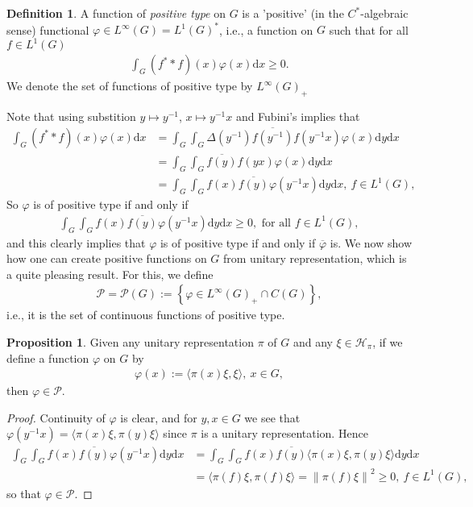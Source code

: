 \documentclass[10pt,twoside,openany,final]{memoir}
\theoremstyle{definition}
\newtheorem{proposition}[theorem]{Proposition}
\newtheorem{definition}[theorem]{Definition}
\theoremstyle{Break}
\newcommand{\lv}{\left\lVert}
\newcommand{\rv}{\right\rVert}
\renewcommand{\H}{\mathcal{H}}
\renewcommand{\d}{\mathrm{d}}
\begin{document}
\begin{definition}
	A function of \emph{positive type} on $G$ is a 'positive' (in the $C^*$-algebraic sense) functional $\varphi \in L^\infty(G)=L^1(G)^*$, i.e., a function on $G$ such that for all $f \in L^1(G)$ 
	\begin{align*}
	\int_G (f^*\ast f)(x)\varphi(x) \d x \geq 0.
	\end{align*}
	We denote the set of functions of positive type by $L^\infty(G)_+$
\end{definition}
Note that using substition $y \mapsto y^{-1}$, $x \mapsto y^{-1}x$ and Fubini's implies that
\begin{align*}
	\int_G (f^* \ast f)(x) \varphi(x)\d x &= \int_G \int_G \Delta(y^{-1}) \overline{f(y^{-1})} f(y^{-1}x) \varphi(x) \d y \d x \\
	&=\int_G \int_G \overline{f(y)} f(yx) \varphi(x) \d y \d x\\
	&= \int_G \int_G f(x) \overline{f(y)} \varphi(y^{-1}x) \d y \d x, \ f \in L^1(G),
\end{align*}
So $\varphi$ is of positive type if and only if 
\begin{align}
	\int_G \int_G f(x) \overline{f(y)} \varphi(y^{-1}x) \d y \d x \geq 0, \text{ for all } f \in L^1(G),
	\label{3.13}
\end{align}
and this clearly implies that $\varphi$ is of positive type if and only if $\overline{\varphi}$ is. We now show how one can create positive functions on $G$ from unitary representation, which is a quite pleasing result. For this, we define
\begin{align*}
	\mathcal{P}=\mathcal{P}(G):=\left\{\varphi\in L^\infty(G)_+ \cap C(G)\right\},
\end{align*}
i.e., it is the set of continuous functions of positive type.
\begin{proposition}
	Given any unitary representation $\pi$ of $G$ and any $\xi \in \H_\pi$, if we define a function $\varphi$ on $G$ by
	\begin{align*}
		\varphi(x):=\langle \pi(x) \xi,\xi\rangle, \ x \in G,
	\end{align*}
	then $\varphi \in \mathcal{P}$.
	\label{3.15}
\end{proposition}
\begin{proof}
	Continuity of $\varphi$ is clear, and for $y,x \in G$ we see that $\varphi(y^{ -1}x)=\langle \pi(x) \xi , \pi(y) \xi\rangle$ since $\pi$ is a unitary representation. Hence
	\begin{align*}
		\int_G \int_G f(x) \overline{f(y)} \varphi(y^{-1}x) \d y \d x&=\int_G \int_G f(x) \overline{f(y)} \langle \pi(x) \xi,\pi(y) \xi \rangle \d y \d x\\
		&= \langle \pi(f) \xi, \pi(f) \xi \rangle=\lv \pi(f) \xi \rv^2 \geq 0, \ f \in L^1(G),
	\end{align*}
	so that $\varphi \in \mathcal{P}$.
\end{proof}
\end{document}
